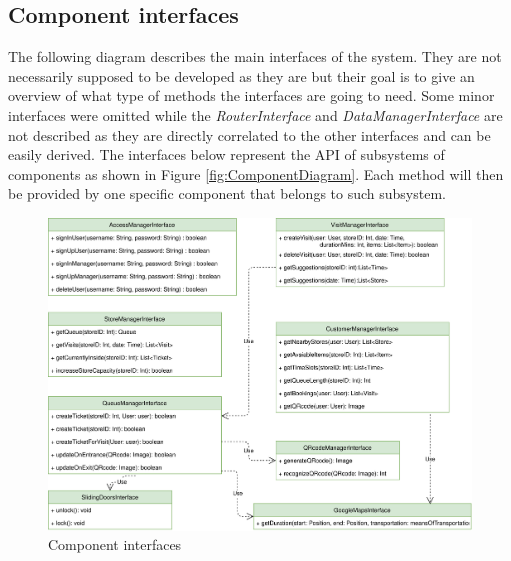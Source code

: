 \documentclass[]{article}
\begin{document}
	\newpage
	
	\subsection{Component interfaces}
	
	The following diagram describes the main interfaces of the system. \newline
	They are not necessarily supposed to be developed as they are but their goal is to give an overview of what type of methods the interfaces are going to need. \newline
	Some minor interfaces were omitted while the \textit{RouterInterface} and \textit{DataManagerInterface} are not described as they are directly correlated to the other interfaces and can be easily derived. \newline
	The interfaces below represent the API of subsystems of components as shown in Figure \ref{fig:ComponentDiagram}. Each method will then be provided by one specific component that belongs to such subsystem.\newline
	
	\begin{figure}[H]
		\centering
		\includegraphics[scale=0.7]{ComponentView/componentInterfaces.png}
		\caption{Component interfaces}
		\label{fig:componentInterfaces}
	\end{figure}
	
	
	\newpage
	
	
\end{document}
